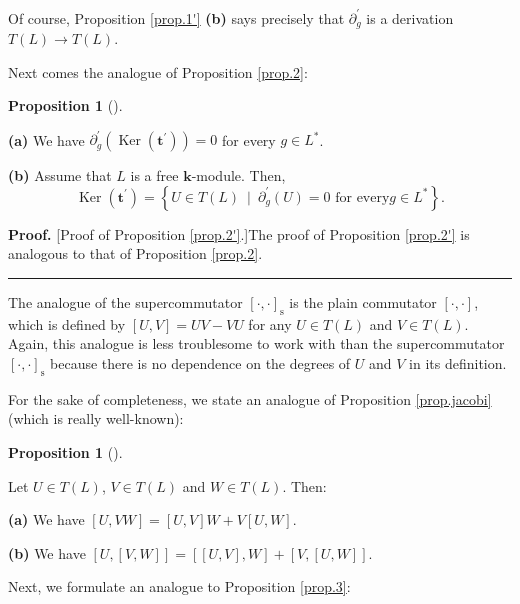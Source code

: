 \documentclass[numbers=enddot,12pt,final,onecolumn,notitlepage]{scrartcl}%
\theoremstyle{definition}
\newtheorem{prop}[theo]{Proposition}
\newenvironment{proposition}[1][]
{\begin{prop}[#1]\begin{leftbar}}
{\end{leftbar}\end{prop}}
\newenvironment{proof}[1][Proof]{\noindent\textbf{#1.} }{\ \rule{0.5em}{0.5em}}
\begin{document}
Of course, Proposition \ref{prop.1'} \textbf{(b)} says precisely that
$\partial_{g}^{\prime}$ is a derivation $T\left(  L\right)  \rightarrow
T\left(  L\right)  $.

Next comes the analogue of Proposition \ref{prop.2}:

\begin{proposition}
\label{prop.2'} \textbf{(a)} We have $\partial_{g}^{\prime}\left(
\operatorname{Ker}\left(  \mathbf{t}^{\prime}\right)  \right)  =0$ for every
$g\in L^{\ast}$. \medskip

\textbf{(b)} Assume that $L$ is a free $\mathbf{k}$-module. Then,%
\[
\operatorname*{Ker}\left(  \mathbf{t}^{\prime}\right)  =\left\{  U\in T\left(
L\right)  \ \mid\ \partial_{g}^{\prime}\left(  U\right)  =0\text{ for every
}g\in L^{\ast}\right\}  .
\]

\end{proposition}

\begin{proof}
[Proof of Proposition \ref{prop.2'}.]The proof of Proposition \ref{prop.2'} is
analogous to that of Proposition \ref{prop.2}.
\end{proof}

The analogue of the supercommutator $\left[  \cdot,\cdot\right]
_{\operatorname*{s}}$ is the plain commutator $\left[  \cdot,\cdot\right]  $,
which is defined by $\left[  U,V\right]  =UV-VU$ for any $U\in T\left(
L\right)  $ and $V\in T\left(  L\right)  $. Again, this analogue is less
troublesome to work with than the supercommutator $\left[  \cdot,\cdot\right]
_{\operatorname*{s}}$ because there is no dependence on the degrees of $U$ and
$V$ in its definition.

For the sake of completeness, we state an analogue of Proposition
\ref{prop.jacobi} (which is really well-known):

\begin{proposition}
\label{prop.jacobi'}Let $U\in T\left(  L\right)  $, $V\in T\left(  L\right)  $
and $W\in T\left(  L\right)  $. Then: \medskip

\textbf{(a)} We have $\left[  U,VW\right]  =\left[  U,V\right]  W+V\left[
U,W\right]  $. \medskip

\textbf{(b)} We have $\left[  U,\left[  V,W\right]  \right]  =\left[  \left[
U,V\right]  ,W\right]  +\left[  V,\left[  U,W\right]  \right]  $.
\end{proposition}

Next, we formulate an analogue to Proposition \ref{prop.3}:
\end{document}

